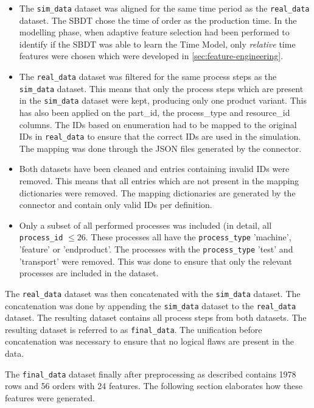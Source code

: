 \begin{itemize}
  \item The \texttt{sim\_data} dataset was aligned for the same time period as the \texttt{real\_data} dataset. The SBDT chose the time of order as the production time. In the modelling phase, when adaptive feature selection had been performed to identify if the SBDT was able to learn the Time Model, only \textit{relative} time features were chosen which were developed in \autoref{sec:feature-engineering}.
  \item The \texttt{real\_data} dataset was filtered for the same process steps as the \texttt{sim\_data} dataset. This means that only the process steps which are present in the \texttt{sim\_data} dataset were kept, producing only one product variant. This has also been applied on the part\_id, the process\_type and resource\_id columns. The IDs based on enumeration had to be mapped to the original IDs in \texttt{real\_data} to ensure that the correct IDs are used in the simulation. The mapping was done through the JSON files generated by the connector.
  \item Both datasets have been cleaned and entries containing invalid IDs were removed. This means that all entries which are not present in the mapping dictionaries were removed. The mapping dictionaries are generated by the connector and contain only valid IDs per definition.
  \item Only a subset of all performed processes was included (in detail, all \texttt{process\_id} $\le 26$. These processes all have the \texttt{process\_type} 'machine', 'feature' or 'endproduct'. The processes with the \texttt{process\_type} 'test' and 'transport' were removed. This was done to ensure that only the relevant processes are included in the dataset.
\end{itemize}

The \texttt{real\_data} dataset was then concatenated with the \texttt{sim\_data} dataset. The concatenation was done by appending the \texttt{sim\_data} dataset to the \texttt{real\_data} dataset. The resulting dataset contains all process steps from both datasets. The resulting dataset is referred to as \texttt{final\_data}. The unification before concatenation was necessary to ensure that no logical flaws are present in the data.

The \texttt{final\_data} dataset finally after preprocessing as described contains 1978 rows and 56 orders with 24 features. The following section elaborates how these features were generated.

